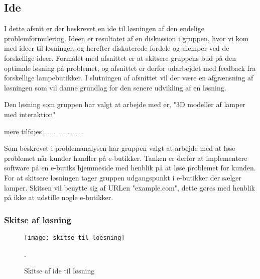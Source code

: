 \subsection{Ide}

I dette afsnit er der beskrevet en ide til løsningen af den endelige problemformulering. Ideen er resultatet af en diskussion i gruppen, hvor vi kom med ideer til løsninger, og herefter diskuterede fordele og ulemper ved de forskellige ideer. Formålet med afsnittet er at skitsere gruppens bud på den optimale løsning på problemet, og afsnittet er derfor udarbejdet med feedback fra forskellige lampebutikker. I slutningen af afsnittet vil der være en afgrænsning af løsningen som vil danne grundlag for den senere udvikling af en løsning.

Den løsning som gruppen har valgt at arbejde med er, "3D modeller af lamper med interaktion" 

mere tilføjes
......
......
......

Som beskrevet i problemanalysen har gruppen valgt at arbejde med at løse problemet når kunder handler på e-butikker. Tanken er derfor at implementere software på en e-butiks hjemmeside med henblik på at løse problemet for kunden. For at skitsere løsningen tager gruppen udgangspunkt i e-butikker der sælger lamper. Skitsen vil benytte sig af URLen "example.com", dette gøres med henblik på ikke at udstille nogle e-butikker.

\subsubsection{Skitse af løsning}

\begin{figure}[H]
   \centering
   \texttt{[image: skitse\_til\_loesning]}
   \caption{Skitse af ide til løsning}.
\end{figure}

